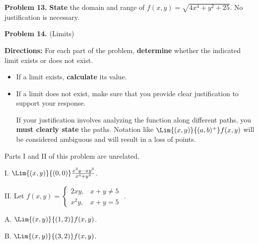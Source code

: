 \documentclass{ximera}
\begin{document}
\textbf{Problem 13.} \textbf{State} the domain and range of $f(x,y) = \sqrt{4x^4+y^2+25}$.  No justification is necessary.

\vspace{35mm}



\vspace{50mm}
\newpage
\textbf{Problem 14.} (Limits) 

\textbf{Directions:}  For each part of the problem, \textbf{determine} whether the indicated limit exists or does not exist.  

\begin{itemize}
\item If a limit exists, \textbf{calculate} its value.  
\item If a limit does not exist, make sure that you provide clear justification to support your response.  

If your justification involves analyzing the function along different paths, you \textbf{must clearly state} the paths. Notation like $\Lim{(x,y)}{(a,b)^+} f(x,y)$ will be considered ambiguous and will result in a loss of points.
\end{itemize}

Parts I and II of this problem are unrelated.

\item[I.] $\Lim{(x,y)}{(0,0)} \frac{x^3y-xy^3}{x^4+y^4}$.

\vspace{25mm}

\item[II.] Let $f(x,y) =  \begin{cases} 2xy , & x+y \neq 5 \\[2 ex]  x^2y , & x+y = 5 \end{cases} $ . 

\item[A.] $\Lim{(x,y)}{(1,2)}f(x,y)$.

\vspace{25mm}

\item[B.] $\Lim{(x,y)}{(3,2)}f(x,y)$.



 
\end{document}
